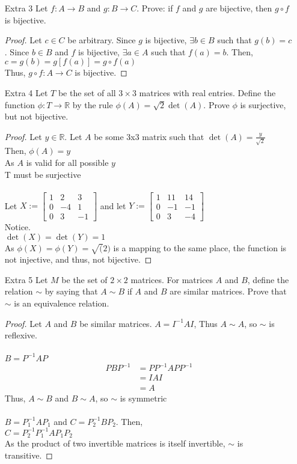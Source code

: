 \documentclass[12pt]{article}
\newcommand{\R}{\mathbb{R}}
\begin{document}
\begin{enumerate}
	\item[Extra 3] Let $f : A \to B$ and $g : B \to C$. Prove: if $f$ and $g$ are bijective, then $g \circ f$ is bijective.
		\begin{proof}
			Let $c\in C$ be arbitrary. Since $g$ is bijective, $\exists b\in B$ such that $g(b)=c$. Since $b\in B$ and $f$ is bijective, $\exists a \in A$ such that $f(a)=b$. Then,\\
			$c=g(b)=g[f(a)]=g\circ f(a)$\\
			Thus, $g\circ f : A \rightarrow C$ is bijective.
		\end{proof}
	\item[Extra 4] Let $T$ be the set of all $3 \times 3$ matrices with real entries. Define the function $\phi : T \to \mathbb{R}$ by the rule $\phi(A) = \sqrt{2} \det(A)$. Prove $\phi$ is surjective, but not bijective.
	\begin{proof}
		Let $y\in \R$. Let $A$ be some 3x3 matrix such that $\det(A) = \frac{y}{\sqrt{2}}$\\
		Then, $\phi(A) = y$\\
		As $A$ is valid for all possible $y$\\
		T must be surjective\\
		\\
		Let $X:= \begin{bmatrix}
		1 & 2 & 3 \\
		0 & -4 & 1 \\
		0 & 3 & -1 
		\end{bmatrix}  $ and 
		let $Y:= \begin{bmatrix}
		1 & 11 & 14 \\
		0 & -1 & -1 \\
		0 & 3 & -4 
		\end{bmatrix}$\\
		Notice.\\
		$\det(X)=\det(Y)=1$\\
		As $\phi(X) =\phi(Y) = \sqrt(2)$ is a mapping to the same place, the function is not injective, and thus, not bijective.
	\end{proof}
	\item[Extra 5] Let $M$ be the set of $2 \times 2$ matrices. For matrices $A$ and $B$, define the relation $\sim$ by saying that $A \sim B$ if $A$ and $B$ are similar matrices. Prove that $\sim$ is an equivalence relation.
	\begin{proof}
		Let $A$ and $B$ be similar matrices.
		$A = I^{-1}AI$, Thus $A \sim A$, so $\sim$ is reflexive.\\
		\\
		$B = P^{-1}AP$
		\begin{align*}
				PBP^{-1}&=PP^{-1}APP^{-1}\\
						&=IAI\\
						&=A
		\end{align*}
		Thus, $A\sim B$ and $B\sim A$, so $\sim$ is symmetric\\
		\\
		$B=P_1^{-1}AP_1$ and $C=P_2^{-1}BP_2$. Then,\\
		$C=P_2^{-1}P_1^{-1}AP_1P_2$\\
		As the product of two invertible matrices is itself invertible, $\sim$ is transitive.


\end{proof}
\end{enumerate}
\end{document}

